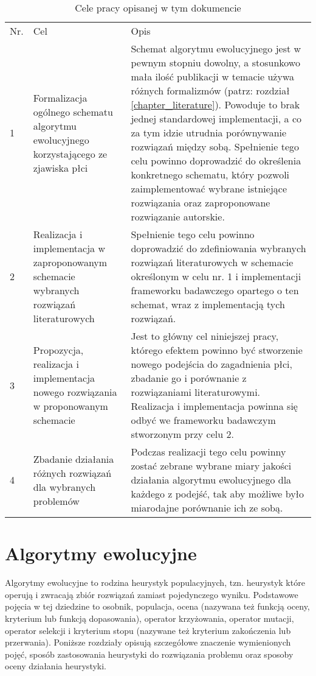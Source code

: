 \documentclass[twoside]{iisthesis}
\begin{document}
\begin{table}
	\caption{Cele pracy opisanej w tym dokumencie \label{table_goals}}
	\begin{tabulary}{\linewidth}{LLL}
		Nr. & Cel & Opis \\
		1 & 
		Formalizacja ogólnego schematu algorytmu ewolucyjnego korzystającego ze zjawiska płci & 
		Schemat algorytmu ewolucyjnego jest w pewnym stopniu dowolny, a stosunkowo mała ilość publikacji w temacie używa różnych formalizmów (patrz: rozdział \ref{chapter_literature}). Powoduje to brak jednej standardowej implementacji, a co za tym idzie utrudnia porównywanie rozwiązań między sobą. Spełnienie tego celu powinno doprowadzić do określenia konkretnego schematu, który pozwoli zaimplementować wybrane istniejące rozwiązania oraz zaproponowane rozwiązanie autorskie. \\
		2 &
		Realizacja i implementacja w zaproponowanym schemacie wybranych rozwiązań literaturowych &
		Spełnienie tego celu powinno doprowadzić do zdefiniowania wybranych rozwiązań literaturowych w schemacie określonym w celu nr. 1 i implementacji frameworku badawczego opartego o ten schemat, wraz z implementacją tych rozwiązań. \\
		3 &
		Propozycja, realizacja i implementacja nowego rozwiązania w proponowanym schemacie &
		Jest to główny cel niniejszej pracy, którego efektem powinno być stworzenie nowego podejścia do zagadnienia płci, zbadanie go i porównanie z rozwiązaniami literaturowymi. Realizacja i implementacja powinna się odbyć we frameworku badawczym stworzonym przy celu 2.\\
		4 &
		Zbadanie działania różnych rozwiązań dla wybranych problemów &
		Podczas realizacji tego celu powinny zostać zebrane wybrane miary jakości działania algorytmu ewolucyjnego dla każdego z podejść, tak aby możliwe było miarodajne porównanie ich ze sobą.
	\end{tabulary}
\end{table}

\FloatBarrier



\chapter{Algorytmy ewolucyjne} \label{chapter_eaDesc}
Algorytmy ewolucyjne to rodzina heurystyk populacyjnych, tzn. heurystyk które operują i zwracają zbiór rozwiązań zamiast pojedynczego wyniku. Podstawowe pojęcia w tej dziedzine to osobnik, populacja, ocena (nazywana też funkcją oceny, kryterium lub funkcją dopasowania), operator krzyżowania, operator mutacji, operator selekcji i kryterium stopu (nazywane też kryterium zakończenia lub przerwania). 
Poniższe rozdziały opisują szczegółowe znaczenie wymienionych pojęć, sposób zastosowania heurystyki do rozwiązania problemu oraz sposoby oceny działania heurystyki.
\end{document}
